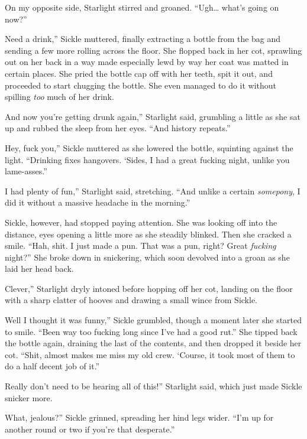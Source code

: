 On my opposite side, Starlight stirred and groaned. “Ugh… what’s going on now?”

\leavevmode{}Need a drink,” Sickle muttered, finally extracting a bottle from the bag and sending a few more rolling across the floor. She flopped back in her cot, sprawling out on her back in a way made especially lewd by way her coat was matted in certain places. She pried the bottle cap off with her teeth, spit it out, and proceeded to start chugging the bottle. She even managed to do it without spilling \textit{too} much of her drink.

\leavevmode{}And now you’re getting drunk again,” Starlight said, grumbling a little as she sat up and rubbed the sleep from her eyes. “And history repeats.”

\leavevmode{}Hey, fuck you,” Sickle muttered as she lowered the bottle, squinting against the light. “Drinking fixes hangovers. ‘Sides, I had a great fucking night, unlike you lame-asses.”

\leavevmode{}I had plenty of fun,” Starlight said, stretching. “And unlike a certain \textit{somepony}, I did it without a massive headache in the morning.”

Sickle, however, had stopped paying attention. She was looking off into the distance, eyes opening a little more as she steadily blinked. Then she cracked a smile. “Hah, shit. I just made a pun. That was a pun, right? Great \textit{fucking} night?” She broke down in snickering, which soon devolved into a groan as she laid her head back.

\leavevmode{}Clever,” Starlight dryly intoned before hopping off her cot, landing on the floor with a sharp clatter of hooves and drawing a small wince from Sickle.

\leavevmode{}Well I thought it was funny,” Sickle grumbled, though a moment later she started to smile. “Been way too fucking long since I’ve had a good rut.” She tipped back the bottle again, draining the last of the contents, and then dropped it beside her cot. “Shit, almost makes me miss my old crew. ‘Course, it took most of them to do a half decent job of it.”

\leavevmode{}Really don’t need to be hearing all of this!” Starlight said, which just made Sickle snicker more.

\leavevmode{}What, jealous?” Sickle grinned, spreading her hind legs wider. “I’m up for another round or two if you’re that desperate.”

